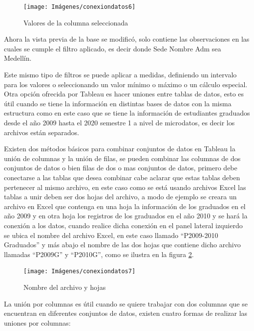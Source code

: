 \documentclass[
]{book}
\begin{document}
\begin{figure}

{\centering \texttt{[image: Imágenes/conexiondatos6]} 

}

\caption{Valores de la columna seleccionada}\label{fig:valoresdelcampo-fig}
\end{figure}

Ahora la vista previa de la base se modificó, solo contiene las observaciones en las cuales se cumple el filtro aplicado, es decir donde Sede Nombre Adm sea Medellín.

Este mismo tipo de filtros se puede aplicar a medidas, definiendo un intervalo para los valores o seleccionando un valor mínimo o máximo o un cálculo especial.
Otra opción ofrecida por Tableau es hacer uniones entre tablas de datos, esto es útil cuando se tiene la información en distintas bases de datos con la misma estructura como en este caso que se tiene la información de estudiantes graduados desde el año 2009 hasta el 2020 semestre 1 a nivel de microdatos, es decir los archivos están separados.

Existen dos métodos básicos para combinar conjuntos de datos en Tableau la unión de columnas y la unión de filas, se pueden combinar las columnas de dos conjuntos de datos o bien filas de dos o mas conjuntos de datos, primero debe conectarse a las tablas que desea combinar cabe aclarar que estas tablas deben pertenecer al mismo archivo, en este caso como se está usando archivos Excel las tablas a unir deben ser dos hojas del archivo, a modo de ejemplo se creara un archivo en Excel que contenga en una hoja la información de los graduados en el año 2009 y en otra hoja los registros de los graduados en el año 2010 y se hará la conexión a los datos, cuando realice dicha conexión en el panel lateral izquierdo se ubica el nombre del archivo Excel, en este caso llamado ``P2009-2010 Graduados'' y más abajo el nombre de las dos hojas que contiene dicho archivo llamadas ``P2009G'' y ``P2010G'', como se ilustra en la figura \ref{fig:hojas-fig}.

\begin{figure}

{\centering \texttt{[image: Imágenes/conexiondatos7]} 

}

\caption{Nombre del archivo y hojas}\label{fig:hojas-fig}
\end{figure}

La unión por columnas es útil cuando se quiere trabajar con dos columnas que se encuentran en diferentes conjuntos de datos, existen cuatro formas de realizar las uniones por columnas:
\end{document}
